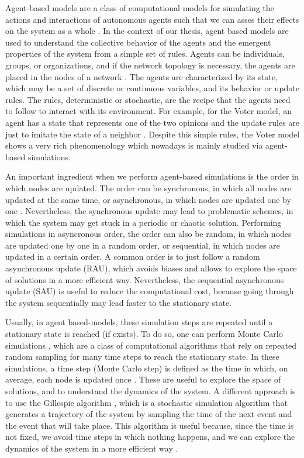 Agent-based models are a class of computational models for simulating the actions and interactions of autonomous agents such that we can asses their effects on the system as a whole \cite{duffy-1998, bonabeau-2002}. In the context of our thesis, agent based models are used to understand the collective behavior of the agents and the emergent properties of the system from a simple set of rules. Agents can be individuals, groups, or organizations, and if the network topology is necessary, the agents are placed in the nodes of a network \cite{macal-2010, railsback-2011}. The agents are characterized by its state, which may be a set of  discrete or continuous variables, and its behavior or update rules. The rules, deterministic or stochastic, are the recipe that the agents need to follow to interact with its environment. For example, for the Voter model, an agent has a state that represents one of the two opinions and the update rules are just to imitate the state of a neighbor \cite{castellano2009statistical}. Despite this simple rules, the Voter model shows a very rich phenomenology which nowadays is mainly studied via agent-based simulations.

An important ingredient when we perform agent-based simulations is the order in which nodes are updated. The order can be synchronous, in which all nodes are updated at the same time, or asynchronous, in which nodes are updated one by one \cite{macal-2010, railsback-2011}. Nevertheless, the synchronous update may lead to problematic schemes, in which the system may get stuck in a periodic or chaotic solution. Performing simulations in asyncronous order, the order can also be random, in which nodes are updated one by one in a random order, or sequential, in which nodes are updated in a certain order. A common order is to just follow a random asynchronous update (RAU), which avoids biases and allows to explore the space of solutions in a more efficient way. Nevertheless, the sequential asynchronous update (SAU) is useful to reduce the computational cost, because going through the system sequentially may lead faster to the stationary state.

Usually, in agent based-models, these simulation steps are repeated until a stationary state is reached (if exists). To do so, one can perform Monte Carlo simulations \cite{metropolis-1949}, which are a class of computational algorithms that rely on repeated random sampling for many time steps to reach the stationary state. In these simulations, a time step (Monte Carlo step) is defined as the time in which, on average, each node is updated once \cite{newman-1999, landau-2014}. These are useful to explore the space of solutions, and to understand the dynamics of the system. A different approach is to use the Gillespie algorithm \cite{gillespie-1977}, which is a stochastic simulation algorithm that generates a trajectory of the system by sampling the time of the next event and the event that will take place. This algorithm is useful because, since the time is not fixed, we avoid time steps in which nothing happens, and we can explore the dynamics of the system in a more efficient way \cite{gibson-2000}.

